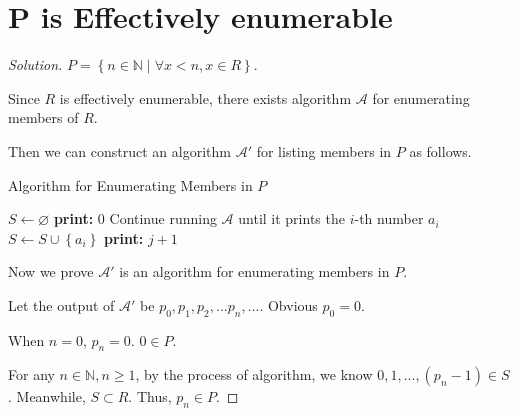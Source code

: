 \documentclass{article}
\newcommand{\set}[1]{\left\{#1\right\}}
\newenvironment{solution}{\begin{proof}[\noindent\it Solution]}{\end{proof}}
\begin{document}
\section{$\boldsymbol{P}$ is Effectively enumerable}
\vspace{1em}
\begin{solution}
    $P=\set{n\in\mathbb{N}\mid \forall x<n, x\in R}$.

    \hspace{2.6em}
    Since $R$ is effectively enumerable, there exists algorithm $\mathcal{A}$ for enumerating members of $R$.

    \hspace{2.6em}
    Then we can construct an algorithm $\mathcal{A}'$ for listing members in $P$ as follows.

    \newpage

    \vspace{-0.5em}
    \begin{algorithm}
        \caption{Algorithm for Enumerating Members in $P$}
        
        {
        $S\gets\varnothing$\;
        \textbf{print: }$0$\;
        {
            Continue running $\mathcal{A}$ until it prints the $i$-th number $a_{i}$\;
            $S\gets S\cup\set{a_i}$\;
            {
                \textbf{print: }$j+1$\;
            }
        }
        }
    \end{algorithm}

    \vspace{-0.9em} \hspace{1.3em}
    Now we prove $\mathcal{A'}$ is an algorithm for enumerating members in $P$.

    \hspace{1.3em}
    Let the output of $\mathcal{A'}$ be $p_0,p_1,p_2,...p_n,...$. Obvious $p_0=0$.

    \hspace{1.3em}
    When $n=0$, $p_n=0$. $0\in P$.
    
    \hspace{1.3em}
    For any $n\in\mathbb{N}, n\geq 1$, by the process of algorithm, we know $0,1,...,(p_n-1)\in S$. Meanwhile, $S\subset R$. Thus, $p_n\in P$.


\end{solution}
\end{document}
